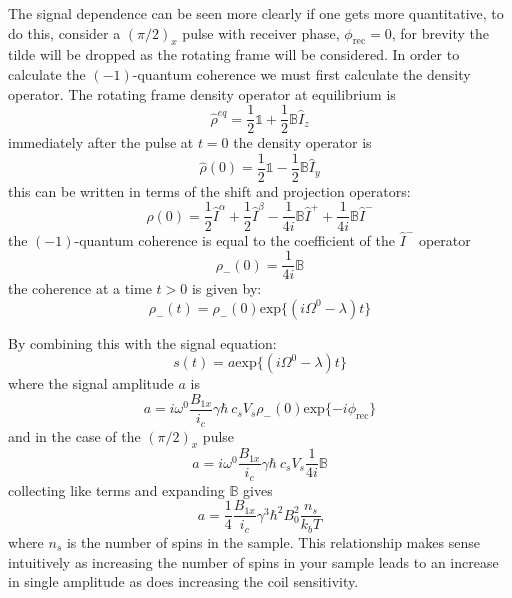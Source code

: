The signal dependence can be seen more clearly if one gets more quantitative, to do this,
consider a $(\pi/2)_x$ pulse with receiver phase, $\phi_{\text{rec}} = 0$, for brevity the
tilde will be dropped as the rotating frame will be considered. In order to calculate the $(-1)$-quantum coherence we must
first calculate the density operator. The rotating frame density operator at equilibrium is
\begin{equation}
  \hat{\rho}^{eq} = \frac{1}{2}\mathbb{1} + \frac{1}{2}\mathbb{B}\hat{I}_z
\end{equation}
immediately after the pulse at $t=0$ the density operator is
\begin{equation}
  \hat{\rho}(0) = \frac{1}{2}\mathbb{1} - \frac{1}{2}\mathbb{B}\hat{I}_y
\end{equation}
this can be written in terms of the shift and projection operators:
\begin{equation}
  \hat{\rho}(0) = \frac{1}{2}\hat{I}^{\alpha} + \frac{1}{2}\hat{I}^{\beta} - \frac{1}{4i}\mathbb{B}\hat{I}^+ + \frac{1}{4i}\mathbb{B}\hat{I}^-
\end{equation}
the $(-1)$-quantum coherence is equal to the coefficient of the $\hat{I}^-$ operator
\begin{equation}
  \rho_-(0) = \frac{1}{4i}\mathbb{B}
\end{equation}
the coherence at a time $t>0$ is given by:
\begin{equation}
  \rho_-(t) = \rho_-(0)\text{exp}\{(i\Omega^0 -\lambda)t\}
\end{equation}

By combining this with the signal equation:
\begin{equation}
  s(t) = a \text{exp}\{(i\Omega^0 -\lambda)t\}
\end{equation}
where the signal amplitude $a$ is
\begin{equation}
  a = i\omega^0\frac{B_{1x}}{i_c}\gamma\hbar~c_sV_s\rho_-(0)\text{exp}\{-i\phi_{\text{rec}}\}
\end{equation}
and in the case of the $(\pi/2)_x$ pulse
\begin{equation}
  a = i\omega^0\frac{B_{1x}}{i_c}\gamma\hbar~c_sV_s\frac{1}{4i}\mathbb{B}
\end{equation}
collecting like terms and expanding $\mathbb{B}$ gives
\begin{equation}
  a = \frac{1}{4}\frac{B_{1x}}{i_c}\gamma^3\hbar^2B_0^2\frac{n_s}{k_bT}
\end{equation}
where $n_s$ is the number of spins in the sample. This relationship makes sense intuitively
as increasing the number of spins in your sample leads to an increase in single amplitude as does increasing the
coil sensitivity.

